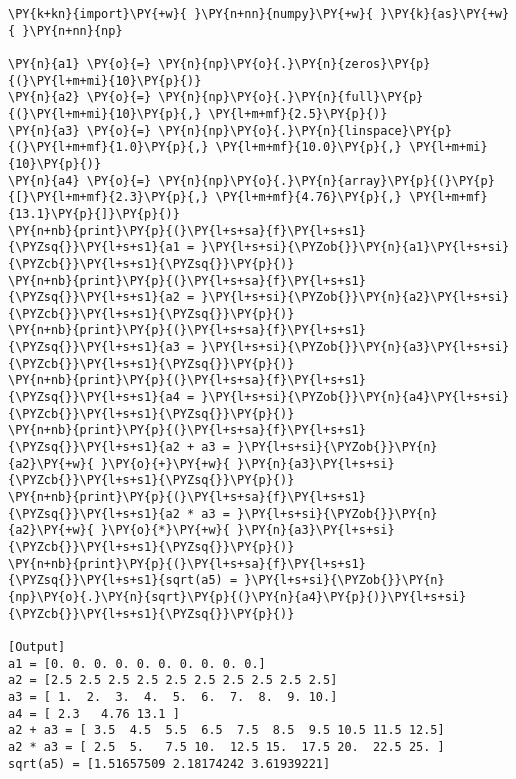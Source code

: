 \begin{Verbatim}[label=\makebox{\href{https://github.com/unipi-physics-labs/statnotes/tree/main/snippy/numpy_arrays.py}{https://github.com/.../numpy\_arrays.py}},commandchars=\\\{\}]
\PY{k+kn}{import}\PY{+w}{ }\PY{n+nn}{numpy}\PY{+w}{ }\PY{k}{as}\PY{+w}{ }\PY{n+nn}{np}

\PY{n}{a1} \PY{o}{=} \PY{n}{np}\PY{o}{.}\PY{n}{zeros}\PY{p}{(}\PY{l+m+mi}{10}\PY{p}{)}
\PY{n}{a2} \PY{o}{=} \PY{n}{np}\PY{o}{.}\PY{n}{full}\PY{p}{(}\PY{l+m+mi}{10}\PY{p}{,} \PY{l+m+mf}{2.5}\PY{p}{)}
\PY{n}{a3} \PY{o}{=} \PY{n}{np}\PY{o}{.}\PY{n}{linspace}\PY{p}{(}\PY{l+m+mf}{1.0}\PY{p}{,} \PY{l+m+mf}{10.0}\PY{p}{,} \PY{l+m+mi}{10}\PY{p}{)}
\PY{n}{a4} \PY{o}{=} \PY{n}{np}\PY{o}{.}\PY{n}{array}\PY{p}{(}\PY{p}{[}\PY{l+m+mf}{2.3}\PY{p}{,} \PY{l+m+mf}{4.76}\PY{p}{,} \PY{l+m+mf}{13.1}\PY{p}{]}\PY{p}{)}
\PY{n+nb}{print}\PY{p}{(}\PY{l+s+sa}{f}\PY{l+s+s1}{\PYZsq{}}\PY{l+s+s1}{a1 = }\PY{l+s+si}{\PYZob{}}\PY{n}{a1}\PY{l+s+si}{\PYZcb{}}\PY{l+s+s1}{\PYZsq{}}\PY{p}{)}
\PY{n+nb}{print}\PY{p}{(}\PY{l+s+sa}{f}\PY{l+s+s1}{\PYZsq{}}\PY{l+s+s1}{a2 = }\PY{l+s+si}{\PYZob{}}\PY{n}{a2}\PY{l+s+si}{\PYZcb{}}\PY{l+s+s1}{\PYZsq{}}\PY{p}{)}
\PY{n+nb}{print}\PY{p}{(}\PY{l+s+sa}{f}\PY{l+s+s1}{\PYZsq{}}\PY{l+s+s1}{a3 = }\PY{l+s+si}{\PYZob{}}\PY{n}{a3}\PY{l+s+si}{\PYZcb{}}\PY{l+s+s1}{\PYZsq{}}\PY{p}{)}
\PY{n+nb}{print}\PY{p}{(}\PY{l+s+sa}{f}\PY{l+s+s1}{\PYZsq{}}\PY{l+s+s1}{a4 = }\PY{l+s+si}{\PYZob{}}\PY{n}{a4}\PY{l+s+si}{\PYZcb{}}\PY{l+s+s1}{\PYZsq{}}\PY{p}{)}
\PY{n+nb}{print}\PY{p}{(}\PY{l+s+sa}{f}\PY{l+s+s1}{\PYZsq{}}\PY{l+s+s1}{a2 + a3 = }\PY{l+s+si}{\PYZob{}}\PY{n}{a2}\PY{+w}{ }\PY{o}{+}\PY{+w}{ }\PY{n}{a3}\PY{l+s+si}{\PYZcb{}}\PY{l+s+s1}{\PYZsq{}}\PY{p}{)}
\PY{n+nb}{print}\PY{p}{(}\PY{l+s+sa}{f}\PY{l+s+s1}{\PYZsq{}}\PY{l+s+s1}{a2 * a3 = }\PY{l+s+si}{\PYZob{}}\PY{n}{a2}\PY{+w}{ }\PY{o}{*}\PY{+w}{ }\PY{n}{a3}\PY{l+s+si}{\PYZcb{}}\PY{l+s+s1}{\PYZsq{}}\PY{p}{)}
\PY{n+nb}{print}\PY{p}{(}\PY{l+s+sa}{f}\PY{l+s+s1}{\PYZsq{}}\PY{l+s+s1}{sqrt(a5) = }\PY{l+s+si}{\PYZob{}}\PY{n}{np}\PY{o}{.}\PY{n}{sqrt}\PY{p}{(}\PY{n}{a4}\PY{p}{)}\PY{l+s+si}{\PYZcb{}}\PY{l+s+s1}{\PYZsq{}}\PY{p}{)}

[Output]
a1 = [0. 0. 0. 0. 0. 0. 0. 0. 0. 0.]
a2 = [2.5 2.5 2.5 2.5 2.5 2.5 2.5 2.5 2.5 2.5]
a3 = [ 1.  2.  3.  4.  5.  6.  7.  8.  9. 10.]
a4 = [ 2.3   4.76 13.1 ]
a2 + a3 = [ 3.5  4.5  5.5  6.5  7.5  8.5  9.5 10.5 11.5 12.5]
a2 * a3 = [ 2.5  5.   7.5 10.  12.5 15.  17.5 20.  22.5 25. ]
sqrt(a5) = [1.51657509 2.18174242 3.61939221]
\end{Verbatim}
